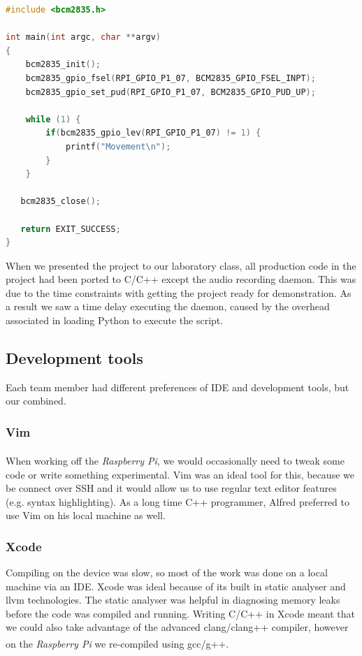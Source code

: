 \documentclass[11pt,a4paper,titlepage]{report}
\newcommand{\rpi}{\textit{Raspberry Pi\textsuperscript{\textregistered}}}
\begin{document}
\begin{lstlisting}[caption={C++ port of PIR-sensor code},label=pir-sensor-test.cpp,language=C++]
#include <bcm2835.h>

int main(int argc, char **argv)
{
    bcm2835_init();
    bcm2835_gpio_fsel(RPI_GPIO_P1_07, BCM2835_GPIO_FSEL_INPT);
    bcm2835_gpio_set_pud(RPI_GPIO_P1_07, BCM2835_GPIO_PUD_UP);

    while (1) {
        if(bcm2835_gpio_lev(RPI_GPIO_P1_07) != 1) {
            printf("Movement\n");
        }
    }

   bcm2835_close();

   return EXIT_SUCCESS;
}
\end{lstlisting}

When we presented the project to our laboratory class, all production code in the project had been ported to C/C++ except the audio recording daemon. This was due to the time constraints with getting the project ready for demonstration. As a result we saw a time delay executing the daemon, caused by the overhead associated in loading Python to execute the script.


\subsection{Development tools}

Each team member had different preferences of IDE and development tools, but our combined.


\subsubsection{Vim}
    When working off the \rpi, we would occasionally need to tweak some code or write something experimental. Vim was an ideal tool for this, because we be connect over SSH and it would allow us to use regular text editor features (e.g. syntax highlighting). As a long time C++ programmer, Alfred preferred to use Vim on his local machine as well.


\subsubsection{Xcode}

      Compiling on the device was slow, so most of the work was done on a local machine via an IDE. Xcode was ideal because of its built in static analyser and llvm technologies. The static analyser was helpful in diagnosing memory leaks before the code was compiled and running. Writing C/C++ in Xcode meant that we could also take advantage of the advanced clang/clang++ compiler, however on the \rpi\xspace we re-compiled using gcc/g++.
\end{document}
